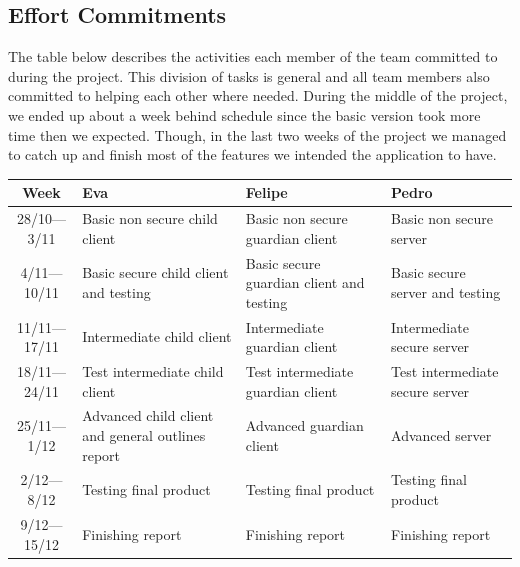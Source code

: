 \documentclass[a4paper]{article}
\begin{document}
\subsection{Effort Commitments}
The table below describes the activities each member of the team committed to during the project. This division of tasks is general and all team members also committed to helping each other where needed. During the middle of the project, we ended up about a week behind schedule since the basic version took more time then we expected. Though, in the last two weeks of the project we managed to catch up and finish most of the features we intended the application to have.
\begin{center}
\begin{tabular}{c m{3.7cm} m{3.7cm} m{3.7cm}}
    \toprule
    Week & Eva & Felipe & Pedro\\ \toprule
    28/10---3/11 & Basic non secure child client & Basic non secure guardian client & Basic non secure server \\\midrule
    4/11---10/11 & Basic secure child client and testing & Basic secure guardian client and testing & Basic secure server and testing\\\midrule
    11/11---17/11 & Intermediate child client & Intermediate guardian client & Intermediate secure server\\\midrule
    18/11---24/11 & Test intermediate child client & Test intermediate guardian client & Test intermediate secure server\\\midrule
    25/11---1/12 & Advanced child client and general outlines report & Advanced guardian client & Advanced server\\\midrule
    2/12---8/12 & Testing final product & Testing final product & Testing final product\\\midrule
    9/12---15/12 & Finishing report & Finishing report & Finishing report\\\bottomrule
\end{tabular}
\end{center}



\end{document}
